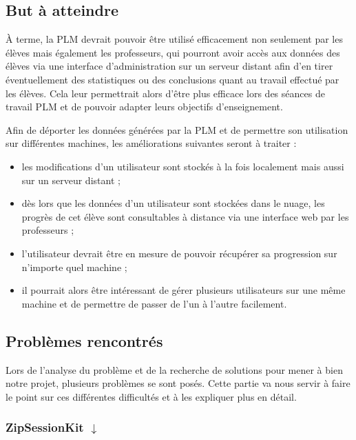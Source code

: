 \subsection{But à atteindre}


À terme, la PLM devrait pouvoir être utilisé efficacement non seulement par les élèves mais également les professeurs, qui pourront avoir accès aux données des élèves via une interface d'administration sur un serveur distant afin d'en tirer éventuellement des statistiques ou des conclusions quant au travail effectué par les élèves. Cela leur permettrait alors d'être plus efficace lors des séances de travail PLM et de pouvoir adapter leurs objectifs d'enseignement.


Afin de déporter les données générées par la PLM et de permettre son utilisation sur différentes machines,  les améliorations suivantes seront à traiter :

\begin{itemize}
\item les modifications d'un utilisateur sont stockés à la fois localement mais aussi sur un serveur distant ;
\item dès lors que les données d'un utilisateur sont stockées \og dans le nuage\fg{}, les progrès de cet élève sont consultables à distance via une interface web par les professeurs ;
\item l'utilisateur devrait être en mesure de pouvoir récupérer sa progression sur n'importe quel machine ;
\item il pourrait alors être intéressant de gérer plusieurs utilisateurs sur une même machine et de permettre de passer de l'un à l'autre facilement.
\end{itemize}


\subsection{Problèmes rencontrés}

Lors de l'analyse du problème et de la recherche de solutions pour mener à bien notre projet, plusieurs problèmes se sont posés. Cette partie va nous servir à faire le point sur ces différentes difficultés et à les expliquer plus en détail.

\subsubsection[ZipSessionKit]{ZipSessionKit \hyperref[zipSessionSol]{$\downarrow$}}
\label{zipSessionPb}

